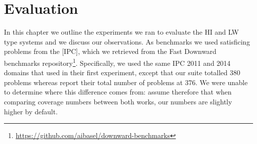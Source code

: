 
\chapter{Evaluation}

In this chapter we outline the experiments we ran to evaluate the HI and LW type systems and we discuss our observations. As benchmarks we used satisficing problems from the [IPC], which we retrieved from the Fast Downward benchmarks repository\footnote{\url{https://github.com/aibasel/downward-benchmarks}}. Specifically, we used the same IPC 2011 and 2014 domains that  used in their first experiment, except that our suite totalled 380 problems whereas  report their total number of problems at 376. We were unable to determine where this difference comes from: assume therefore that when comparing coverage numbers between both works, our numbers are slightly higher by default.

